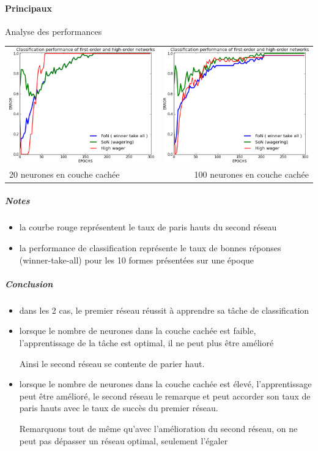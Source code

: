     \paragraph{Principaux}
      Analyse des performances
      \begin{center}
	\begin{tabular}{lr}
	  \hspace*{-1cm}
	  \includegraphics[width=250px]{data/expC1/perf_20.png}
	  &
	  \includegraphics[width=250px]{data/expC1/perf_100.png} \\
	  
	  20 neurones en couche cachée
	  &
	  \hspace*{-1cm}
	  100 neurones en couche cachée
	\end{tabular}
      \end{center}
      \subparagraph{Notes}
	\begin{itemize}
	  \item la courbe rouge représentent le taux de paris hauts du second réseau
	  \item la performance de classification représente le taux de bonnes réponses (winner-take-all) pour les 10 formes présentées sur une époque
	\end{itemize}
      \subparagraph{Conclusion}
	\begin{itemize}
	  \item dans les 2 cas, le premier réseau réussit à apprendre sa tâche de classification
	  \item lorsque le nombre de neurones dans la couche cachée est faible, l'apprentissage de la tâche est optimal, il ne peut plus être amélioré
	  
	  Ainsi le second réseau se contente de parier haut.
	  \item lorsque le nombre de neurones dans la couche cachée est élevé, l'apprentissage peut être amélioré, le second réseau 
	  le remarque et peut accorder son taux de paris hauts avec le taux de succès du premier réseau.
	  
	  Remarquons tout de même qu'avec l'amélioration du second réseau, on ne peut pas dépasser un réseau optimal, seulement l'égaler
	\end{itemize}
